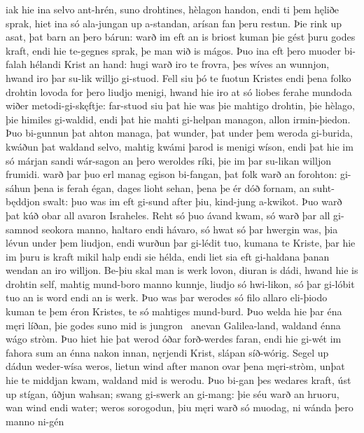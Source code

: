 iak hie ina selvo ant-hrén, \hld\ suno drohtines,
hèlagon handon, \hld\ endi ti þem hęliðe sprak,
hiet ina só ala-jungan \hld\ up a-standan,
arísan fan þeru restun. \hld\ Þie rink up asat,
þat barn an þero bárun: \hld\ warð im eft an is briost kuman
þie gést þuru godes kraft, \hld\ endi hie te-gegnes sprak,
þe man wið is mágos. \hld\ Þuo ina eft þero muoder bi-falah
hélandi Krist an hand: \hld\ hugi warð iro te frovra,
þes wíves an wunnjon, \hld\ hwand iro þar su-lik willjo gi-stuod.
Fell siu þó te fuotun Kristes \hld\ endi þena folko drohtin
lovoda for þero liudjo menigi, \hld\ hwand hie iro at só liobes ferahe
mundoda wiðer metodi-gi-skęftje: \hld\ far-stuod siu þat hie was þie mahtigo drohtin,
þie hèlago, þie himiles gi-waldid, \hld\ endi þat hie mahti gi-helpan managon,
allon irmin-þiedon. \hld\ Þuo bi-gunnun þat ahton managa,
þat wunder, þat under þem weroda gi-burida, \hld\ kwáðun þat waldand selvo,
mahtig kwámi þarod is menigi wíson, \hld\ endi þat hie im só márjan sandi
wár-sagon an þero weroldes ríki, \hld\ þie im þar su-likan willjon frumidi.
warð þar þuo erl manag \hld\ egison bi-fangan,
þat folk warð an forohton: \hld\ gi-sáhun þena is ferah égan,
dages lioht sehan, \hld\ þena þe ér dóð fornam,
an suht-będdjon swalt: \hld\ þuo was im eft gi-sund after þiu,
kind-jung a-kwikot. \hld\ Þuo warð þat kúð obar all
avaron Israheles. \hld\ Reht só þuo ávand kwam,
só warð þar all gi-samnod \hld\ seokora manno,
haltaro endi hávaro, \hld\ só hwat só þar hwergin was,
þia lévun under þem liudjon, \hld\ endi wurðun þar gi-lédit tuo,
kumana te Kriste, \hld\ þar hie im þuru is kraft mikil
halp endi sie hélda, \hld\ endi liet sia eft gi-haldana þanan
wendan an iro willjon. \hld\ Be-þiu skal man is werk lovon,
diuran is dádi, \hld\ hwand hie is drohtin self,
mahtig mund-boro \hld\ manno kunnje,
liudjo só hwi-likon, \hld\ só þar gi-lóbit tuo
an is word endi an is werk. \hld\ Þuo was þar werodes só filo
allaro eli-þiodo \hld\ kuman te þem éron Kristes,
te só mahtiges mund-burd. \hld\ Þuo welda hie þar éna męri líðan,
þie godes suno mid is jungron \hld\ anevan Galilea-land,
waldand énna wágo stròm. \hld\ Þuo hiet hie þat werod óðar
forð-werdes faran, \hld\ endi hie gi-wét im fahora sum
an énna nakon innan, \hld\ nęrjendi Krist,
slápan síð-wórig. \hld\ Segel up dádun
weder-wísa weros, \hld\ lietun wind after
manon ovar þena męri-stròm, \hld\ unþat hie te middjan kwam,
waldand mid is werodu. \hld\ Þuo bi-gan þes wedares kraft,
úst up stígan, \hld\ úðjun wahsan;
swang gi-swerk an gi-mang: \hld\ þie séu warð an hruoru,
wan wind endi water; \hld\ weros sorogodun,
þiu męri warð só muodag, \hld\ ni wánda þero manno ni-gén
